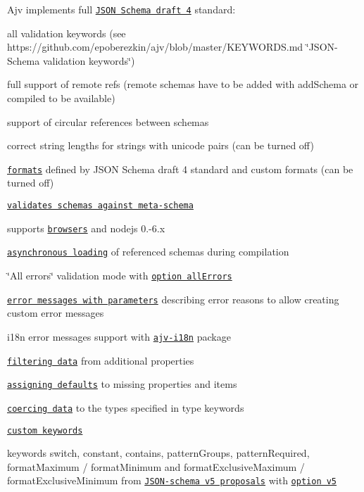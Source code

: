 \begin{DoxyItemize}
\item Ajv implements full \href{http://json-schema.org/}{\tt J\+S\+ON Schema draft 4} standard\+:
\begin{DoxyItemize}
\item all validation keywords (see https\+://github.com/epoberezkin/ajv/blob/master/\+K\+E\+Y\+W\+O\+R\+D\+S.\+md \char`\"{}\+J\+S\+O\+N-\/\+Schema validation keywords\char`\"{})
\item full support of remote refs (remote schemas have to be added with {\ttfamily add\+Schema} or compiled to be available)
\item support of circular references between schemas
\item correct string lengths for strings with unicode pairs (can be turned off)
\item \href{#formats}{\tt formats} defined by J\+S\+ON Schema draft 4 standard and custom formats (can be turned off)
\item \href{#api-validateschema}{\tt validates schemas against meta-\/schema}
\end{DoxyItemize}
\item supports \href{#using-in-browser}{\tt browsers} and nodejs 0.-\/6.\+x
\item \href{#asynchronous-compilation}{\tt asynchronous loading} of referenced schemas during compilation
\item \char`\"{}\+All errors\char`\"{} validation mode with \href{#options}{\tt option all\+Errors}
\item \href{#validation-errors}{\tt error messages with parameters} describing error reasons to allow creating custom error messages
\item i18n error messages support with \href{https://github.com/epoberezkin/ajv-i18n}{\tt ajv-\/i18n} package
\item \href{#filtering-data}{\tt filtering data} from additional properties
\item \href{#assigning-defaults}{\tt assigning defaults} to missing properties and items
\item \href{#coercing-data-types}{\tt coercing data} to the types specified in {\ttfamily type} keywords
\item \href{#defining-custom-keywords}{\tt custom keywords}
\item keywords {\ttfamily switch}, {\ttfamily constant}, {\ttfamily contains}, {\ttfamily pattern\+Groups}, {\ttfamily pattern\+Required}, {\ttfamily format\+Maximum} / {\ttfamily format\+Minimum} and {\ttfamily format\+Exclusive\+Maximum} / {\ttfamily format\+Exclusive\+Minimum} from \href{https://github.com/json-schema/json-schema/wiki/v5-Proposals}{\tt J\+S\+O\+N-\/schema v5 proposals} with \href{#options}{\tt option v5}

\end{DoxyItemize}
